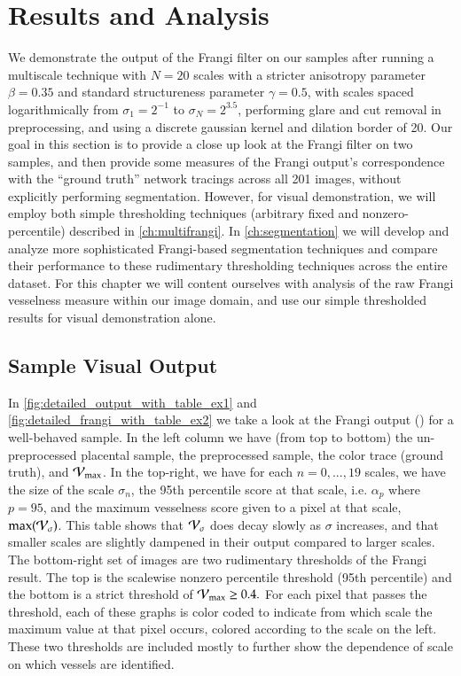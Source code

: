 \chapter{Results and Analysis} \label{ch:results-analysis}

We demonstrate the output of the Frangi filter on our samples after running a multiscale technique with $N=20$ scales with a stricter anisotropy parameter $\beta = 0.35$ and standard structureness parameter $\gamma=0.5$,
with scales spaced logarithmically from $\sigma_1 = 2^{-1}$ to $\sigma_N = 2^{3.5}$, performing glare and cut removal in preprocessing, and using a discrete gaussian kernel and dilation border of 20.
Our goal in this section is to provide a close up look at the Frangi filter on two samples, and then provide some measures of the Frangi output's correspondence with the ``ground truth'' network tracings across all 201 images, without explicitly performing segmentation. However, for visual demonstration, we will employ both simple thresholding techniques (arbitrary fixed and nonzero-percentile) described in \cref{ch:multifrangi}. In \cref{ch:segmentation} we will develop and analyze more sophisticated Frangi-based segmentation techniques and compare their performance to these rudimentary thresholding techniques across the entire dataset. For this chapter we will content ourselves with analysis of the raw Frangi vesselness measure within our image domain, and use our simple thresholded results for visual demonstration alone.

\section{Sample Visual Output}
In \cref{fig:detailed_output_with_table_ex1} and \cref{fig:detailed_frangi_with_table_ex2} we take a look at the Frangi output (\Vmax) for a well-behaved sample. In the left column we have (from top to bottom) the un-preprocessed placental sample, the preprocessed sample, the color trace (ground truth), and $\mathcal{V}_{\max}$. In the top-right, we have for each $n=0,...,19$ scales, we have the size of the scale $\sigma_n$, the 95th percentile score at that scale, i.e. $\alpha_p$ where $p=95$, and the maximum vesselness score given to a pixel at that scale, $\max(\mathcal{V}_{\sigma})$. This table shows that $\mathcal{V}_{\sigma}$ does decay slowly as $\sigma$ increases, and that smaller scales are slightly dampened in their output compared to larger scales.  The bottom-right set of images are two rudimentary thresholds of the Frangi result. The top is the scalewise nonzero percentile threshold (95th percentile) and the bottom is a strict threshold of $\mathcal{V}_{\max} \ge 0.4.$  For each pixel that passes the threshold, each of these graphs is color coded to indicate from which scale the maximum value at that pixel occurs, colored according to the scale on the left. These two thresholds are included mostly to further show the dependence of scale on which vessels are identified.

